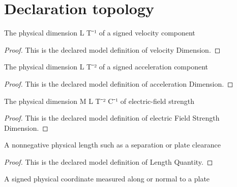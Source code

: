 \section{Declaration topology}
\begin{definition}
  \label{def:physics:phyx-mini-0838:phyxminiproblems-problemphyxmini0838-velocitydimension}
  The physical dimension L T⁻¹ of a signed velocity component
\end{definition}
\begin{proof}
  This is the declared model definition of velocity Dimension.
\end{proof}
\begin{definition}
  \label{def:physics:phyx-mini-0838:phyxminiproblems-problemphyxmini0838-accelerationdimension}
  The physical dimension L T⁻² of a signed acceleration component
\end{definition}
\begin{proof}
  This is the declared model definition of acceleration Dimension.
\end{proof}
\begin{definition}
  \label{def:physics:phyx-mini-0838:phyxminiproblems-problemphyxmini0838-electricfieldstrengthdimension}
  The physical dimension M L T⁻² C⁻¹ of electric-field strength
\end{definition}
\begin{proof}
  This is the declared model definition of electric Field Strength Dimension.
\end{proof}
\begin{definition}
  \label{def:physics:phyx-mini-0838:phyxminiproblems-problemphyxmini0838-lengthquantity}
  A nonnegative physical length such as a separation or plate clearance
\end{definition}
\begin{proof}
  This is the declared model definition of Length Quantity.
\end{proof}
\begin{definition}
  \label{def:physics:phyx-mini-0838:phyxminiproblems-problemphyxmini0838-signedlengthquantity}
  A signed physical coordinate measured along or normal to a plate
\end{definition}
